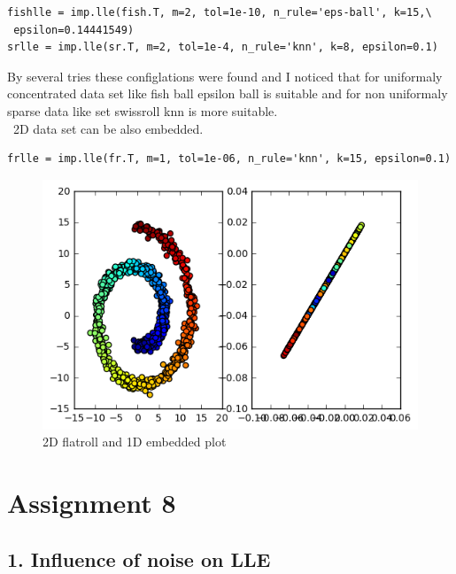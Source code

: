 \documentclass[a4paper,11pt]{article}
\begin{document}
\begin{verbatim}
fishlle = imp.lle(fish.T, m=2, tol=1e-10, n_rule='eps-ball', k=15,\
 epsilon=0.14441549)
srlle = imp.lle(sr.T, m=2, tol=1e-4, n_rule='knn', k=8, epsilon=0.1)
\end{verbatim}
By several tries these configlations were found and I noticed that for uniformaly concentrated data set like fish ball epsilon ball is suitable and for non uniformaly sparse data like set swissroll knn is more suitable. \\
\ 2D data set can be also embedded. 
\begin{verbatim}
frlle = imp.lle(fr.T, m=1, tol=1e-06, n_rule='knn', k=15, epsilon=0.1)
\end{verbatim}
\begin{figure}[htbp]
  \includegraphics[scale=0.5]{2d1d.png}
  \caption{2D flatroll and 1D embedded plot}
\end{figure}

\section*{Assignment 8}
\subsection*{1. Influence of noise on LLE}
\end{document}
